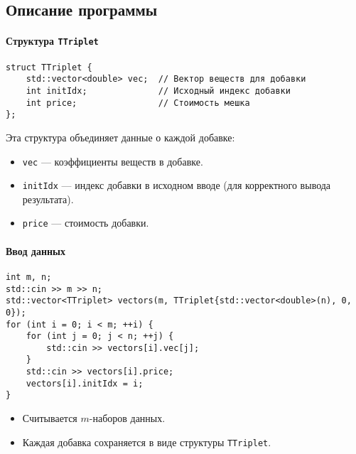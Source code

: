 \documentclass[12pt]{article}
\begin{document}
\subsection*{Описание программы}

\paragraph{Структура \texttt{TTriplet}}
\begin{verbatim}
struct TTriplet {
    std::vector<double> vec;  // Вектор веществ для добавки
    int initIdx;              // Исходный индекс добавки
    int price;                // Стоимость мешка
};
\end{verbatim}
Эта структура объединяет данные о каждой добавке:
\begin{itemize}
    \item \texttt{vec} — коэффициенты веществ в добавке.
    \item \texttt{initIdx} — индекс добавки в исходном вводе (для корректного вывода результата).
    \item \texttt{price} — стоимость добавки.
\end{itemize}

\paragraph{Ввод данных}
\begin{verbatim}
int m, n;
std::cin >> m >> n;
std::vector<TTriplet> vectors(m, TTriplet{std::vector<double>(n), 0, 0});
for (int i = 0; i < m; ++i) {
    for (int j = 0; j < n; ++j) {
        std::cin >> vectors[i].vec[j];
    }
    std::cin >> vectors[i].price;
    vectors[i].initIdx = i;
}
\end{verbatim}
\begin{itemize}
    \item Считывается \( m \)-наборов данных.
    \item Каждая добавка сохраняется в виде структуры \texttt{TTriplet}.
\end{itemize}
\end{document}
